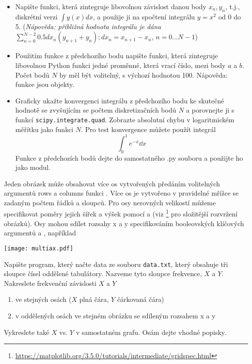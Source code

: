 \begin{exercise}
    \begin{itemize}
    \item Napište funkci, která zintegruje libovolnou závislost danou body $x_n, y_n$, t.j., diskrétní verzi $\int y(x)dx$, a použije ji na spočtení integrálu $y = x^2$ od 0 do 5. (\emph{Nápověda: přibližná hodnota integrálu je dána $\sum_{n=0}^{N-2} 0.5 dx_n(y_{n+1} + y_n); dx_n = x_{n+1} - x_n$}, $n = 0 \dots N-1$)

    \item Použitím funkce z předchozího bodu napište funkci, která zintegruje libovolnou Python funkci jedné proměnné, která vrací číslo, mezi body $a$ a $b$. Počet bodů $N$ by měl být volitelný, s výchozí hodnotou 100. Nápověda: funkce jsou objekty.

    \item Graficky ukažte konvergenci integrálu z předchozího bodu ke skutečné hodnotě se zvyšujícím se počtem diskretizačních bodů $N$ a porovnejte ji s funkcí \verb|scipy.integrate.quad|. Zobrazte absolutní chybu v logaritmickém měřítku jako funkci $N$. Pro test konvergence můžete použít integrál
    \[ \int_0^1 e^{-x} \dd x \]
    Funkce z předchozích bodů dejte do samostatného .py souboru a použijte ho jako modul.
    \end{itemize}
\end{exercise}

Jeden obrázek může obsahovat více os vytvořených předáním volitelných argumentů rows a columns funkci . Více os je vytvořeno v pravidelné mřížce se zadaným počtem řádků a sloupců. Pro osy nerovných velikostí můžeme specifikovat poměry jejich šířek a výšek pomocí  a  (viz  \footnote{\url{https://matplotlib.org/3.5.0/tutorials/intermediate/gridspec.html}} pro složitější rozvržení obrázků). Osy mohou sdílet rozsahy x a y specifikováním booleovských klíčových argumentů  a , například

\begin{center}
    \texttt{[image: multiax.pdf]}
\end{center}
\begin{exercise}
    \label{ex:peak}
    Napište program, který načte data ze souboru \verb|data.txt|, který obsahuje tři sloupce čísel oddělené tabulátory. Nazveme tyto sloupce frekvence, $X$ a $Y$. Nakreslete frekvenční závislosti $X$ a $Y$
    \begin{enumerate}
        \item ve stejných osách ($X$ plná čára, $Y$ čárkovaná čára)
        \item v oddělených osách ve stejném obrázku se sdíleným rozsahem x a y
    \end{enumerate}
    Vykreslete také $X$ vs. $Y$ v samostatném grafu. Osám dejte vhodné popisky.
\end{exercise}

